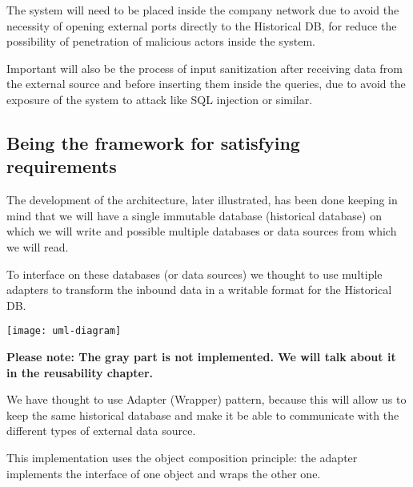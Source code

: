 The system will need to be placed inside the company network due to avoid the necessity of opening external ports directly to the Historical DB, for reduce the possibility of penetration of malicious actors inside the system.

Important will also be the process of input sanitization after receiving data from the external source and before inserting them inside the queries, due to avoid the exposure of the system to attack like SQL injection or similar.

\subsection{Being the framework for satisfying requirements}

The development of the architecture, later illustrated, has been done keeping in mind that we will have a single immutable database (historical database) on which we will write and possible multiple databases or data sources from which we will read.

To interface on these databases (or data sources) we thought to use multiple adapters to transform the inbound data in a writable format for the Historical DB.

\begin{center}
\texttt{[image: uml-diagram]}
\end{center}

\textbf{Please note: The gray part is not implemented. We will talk about it in the reusability chapter.}

We have thought to use Adapter (Wrapper) pattern, because this will allow us to keep the same historical database and make it be able to communicate with the different types of external data source.

This implementation uses the object composition principle: the adapter implements the interface of one object and wraps the other one.

